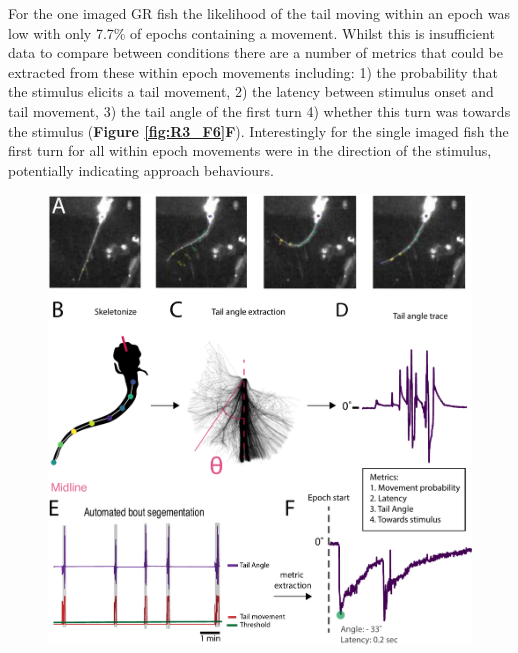 For the one imaged GR fish the likelihood of the tail moving within an epoch was low with only 7.7\% of epochs containing a movement. Whilst this is insufficient data to compare between conditions there are a number of metrics that could be extracted from these within epoch movements including: 1) the probability that the stimulus elicits a tail movement, 2) the latency between stimulus onset and tail movement, 3) the tail angle of the first turn 4) whether this turn was towards the stimulus (\textbf{Figure \ref{fig:R3_F6}F}). Interestingly for the single imaged fish the first turn for all within epoch movements were in the direction of the stimulus, potentially indicating approach behaviours. 

\begin{figure}[!ht]
        \captionsetup{}
        \centering
        \includegraphics[width =  0.7\paperwidth]{Figures/R3_F4.pdf}

\end{figure}

